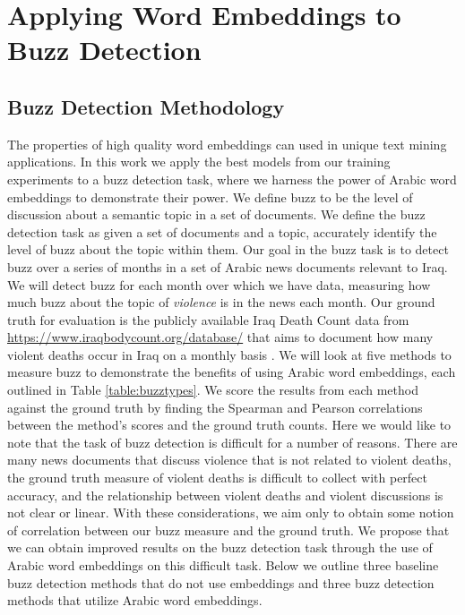 \chapter{Applying Word Embeddings to Buzz Detection}
\label{sec:buzz}

\section{Buzz Detection Methodology}

The properties of high quality word embeddings can used in unique text mining applications. In this work we apply the best models from our training experiments to a buzz detection task, where we harness the power of Arabic word embeddings to demonstrate their power. We define buzz to be the level of discussion about a semantic topic in a set of documents. We define the buzz detection task as given a set of documents and a topic, accurately identify the level of buzz about the topic within them. Our goal in the buzz task is to detect buzz over a series of months in a set of Arabic news documents relevant to Iraq. We will detect buzz for each month over which we have data, measuring how much buzz about the topic of \textit{violence} is in the news each month. Our ground truth for evaluation is the publicly available Iraq Death Count data from \url{https://www.iraqbodycount.org/database/} that aims to document how many violent deaths occur in Iraq on a monthly basis \cite{IraqB68:online}. We will look at five methods to measure buzz to demonstrate the benefits of using Arabic word embeddings, each outlined in Table \ref{table:buzztypes}. We score the results from each method against the ground truth by finding the Spearman and Pearson correlations between the method's scores and the ground truth counts. Here we would like to note that the task of buzz detection is difficult for a number of reasons. There are many news documents that discuss violence that is not related to violent deaths, the ground truth measure of violent deaths is difficult to collect with perfect accuracy, and the relationship between violent deaths and violent discussions is not clear or linear. With these considerations, we aim only to obtain some notion of correlation between our buzz measure and the ground truth. We propose that we can obtain improved results on the buzz detection task through the use of Arabic word embeddings on this difficult task. Below we outline three baseline buzz detection methods that do not use embeddings and three buzz detection methods that utilize Arabic word embeddings.
